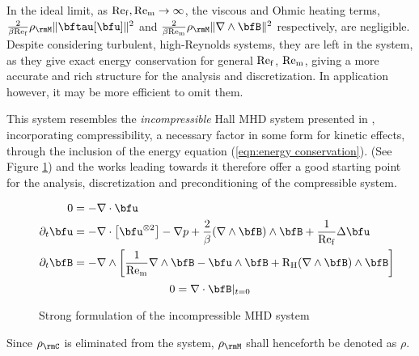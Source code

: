     In the ideal limit, as $\mathrm{Re}_{\mathrm{f}}, \mathrm{Re}_{\mathrm{m}}  \rightarrow  \infty$, the viscous and Ohmic heating terms, $\frac{2}{\beta\rmRef}\rho_{\rmM}\|\bftau[\bfu]\|^{2}$ and $\frac{2}{\beta\rmRem}\rho_{\rmM}\|\nabla\wedge\bfB\|^{2}$ respectively, are negligible. Despite considering turbulent, high-Reynolds systems, they are left in the system, as they give exact energy conservation for general $\mathrm{Re}_{\mathrm{f}}$, $\mathrm{Re}_{\mathrm{m}}$, giving a more accurate and rich structure for the analysis and discretization. In application however, it may be more efficient to omit them.

    This system resembles the \emph{incompressible} Hall MHD system presented in \cite{Laakmann_Hu_Farrell_2022}, incorporating compressibility, a necessary factor in some form for kinetic effects, through the inclusion of the energy equation (\ref{eqn:energy conservation}). (See Figure \ref{fig:incompressible strong form}) \cite{Laakmann_Hu_Farrell_2022} and the works leading towards it therefore offer a good starting point for the analysis, discretization and preconditioning of the compressible system.

    \begin{figure}
        \centering
        \line
        \begin{align}
                           0  &=  - \nabla\cdot\bfu  \\
            \partial_{t}\bfu  &=  - \nabla\cdot\left[\bfu^{\otimes 2}\right] - \nabla p + \frac{2}{\beta}(\nabla\wedge\bfB)\wedge\bfB + \frac{1}{\rmRef}\Delta\bfu  \\
            \partial_{t}\bfB  &=  - \nabla\wedge\left[\frac{1}{\rmRem}\nabla\wedge\bfB - \bfu\wedge\bfB + \rmRH(\nabla\wedge\bfB)\wedge\bfB\right]
        \end{align}
        \shortline
        \begin{equation}
            0  =  \nabla\cdot\bfB|_{t = 0}
        \end{equation}
        \line
        \caption{Strong formulation of the incompressible MHD system}
        \label{fig:incompressible strong form}
    \end{figure}

    Since $\rho_{\rmC}$ is eliminated from the system, $\rho_{\rmM}$ shall henceforth be denoted as $\rho$.

    
    
    
    
    
    
    
    
    